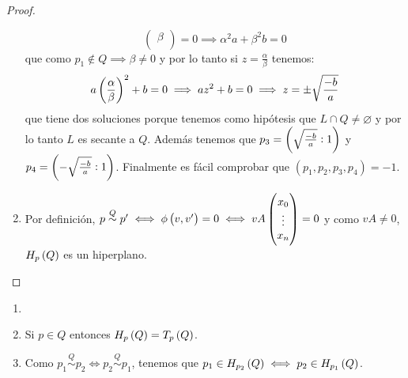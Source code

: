 \begin{proof}
\begin{enumerate}[(1)]
\[\begin{pmatrix}
     \beta\\
    \end{pmatrix}=0 \implies \alpha^2 a+\beta^2 b=0 
   \]
   que como $p_1\not\in Q \implies \beta\neq 0$ y por lo tanto si $z=\frac{\alpha}{\beta}$ tenemos:
   \[
    a\left(\frac{\alpha}{\beta}\right)^2 +b =0 \implies az^2 +b=0 \implies z=\pm \sqrt{\frac{-b}{a}}
   \]
   que tiene dos soluciones porque tenemos como hipótesis que $L\cap Q\neq\varnothing$ y por lo tanto
   $L$ es secante a $Q$. Además tenemos que $p_3=\left(\sqrt{\frac{-b}{a}}:1\right)$ y $p_4=\left(-\sqrt{\frac{-b}{a}}:1\right)$.
   Finalmente es fácil comprobar que $(p_1,p_2,p_3,p_4)=-1$.
   \item Por definición, $p \stackrel{Q}{\sim} p' \iff \phi\left( v,v'\right)=0 \iff vA\begin{pmatrix}x_0\\ \vdots\\ x_n\\ \end{pmatrix}=0$
   y como $vA\neq 0$, $H_p\left( Q\right)$ es un hiperplano.
  \end{enumerate}
\end{proof}

\begin{obs}
 \begin{enumerate}[(1)]
  \item []
  \item Si $p\in Q$ entonces $H_p\left( Q\right) = T_p\left( Q\right)$.
  \item Como $p_1 \stackrel{Q}{\sim} p_2 \iff p_2 \stackrel{Q}{\sim} p_1$, tenemos que $p_1\in H_{p_2}\left( Q\right) \iff
  p_2\in H_{p_1}\left( Q\right)$.
 \end{enumerate}
\end{obs}


